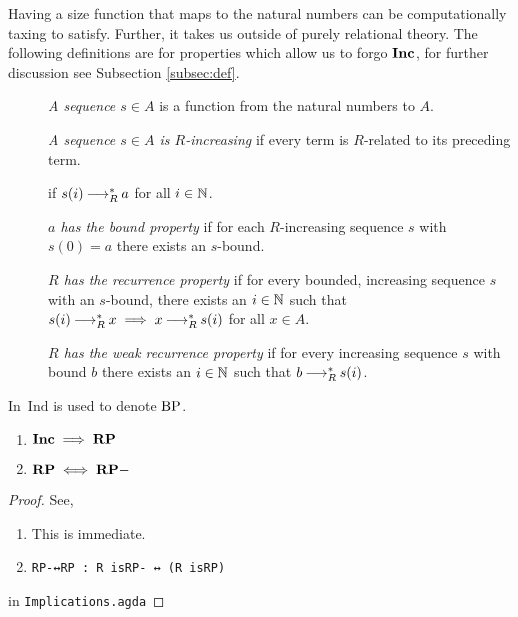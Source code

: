 Having a size function that maps to the natural numbers can be computationally taxing to satisfy.
Further, it takes us outside of purely relational theory. The following definitions are for properties which allow us to forgo $\mathbf{Inc}$, for further discussion see Subsection \ref{subsec:def}.
\begin{definition} \label{def:rp} \hfill
    \begin{description}
        \item[] \emph{A sequence $s \in A$} is a function from the natural numbers to $A$.
        \item[] \emph{A sequence $s \in A$ is $R$-increasing} if every term is $R$-related to its preceding term.
        \item[] if $s (i) \mathbin{\longrightarrow_R^*} a$ for all $i \in \mathbb{N}$.
        \item[] \emph{$a$ has the bound property} if for each $R$-increasing sequence $s$ with $s (0) = a$ there exists an $s$-bound.
        \item[] \emph{$R$ has the recurrence property} if for every bounded, increasing sequence $s$ with an $s$-bound, there exists an $i \in \mathbb{N}$ such that
        $s (i) \mathbin{\longrightarrow_R^*} x \implies x \mathbin{\longrightarrow_R^*} s (i)$ for all $x\in A$. 
        \item[] \emph{$R$ has the weak recurrence property} if for every increasing sequence $s$ with bound $b$ there exists an $i \in \mathbb{N}$ such that $b \mathbin{\longrightarrow_R^*} s (i)$.
    \end{description}
\end{definition}

In \terese $\mathrm{\,Ind}$ is used to denote $\mathrm{BP}$.

\begin{proposition}\hfill
    \begin{enumerate}
        \item $\mathbf{Inc} \implies \mathbf{RP}$
        \item $\mathbf{RP} \iff \mathbf{RP{-}}$
    \end{enumerate}
\end{proposition}

\begin{proof}
    See, \hfill
    \begin{enumerate}
        \item This is immediate.
        \item \verb|RP-↔RP : R isRP- ↔ (R isRP)|
    \end{enumerate}
    in \texttt{Implications.agda}
\end{proof}

